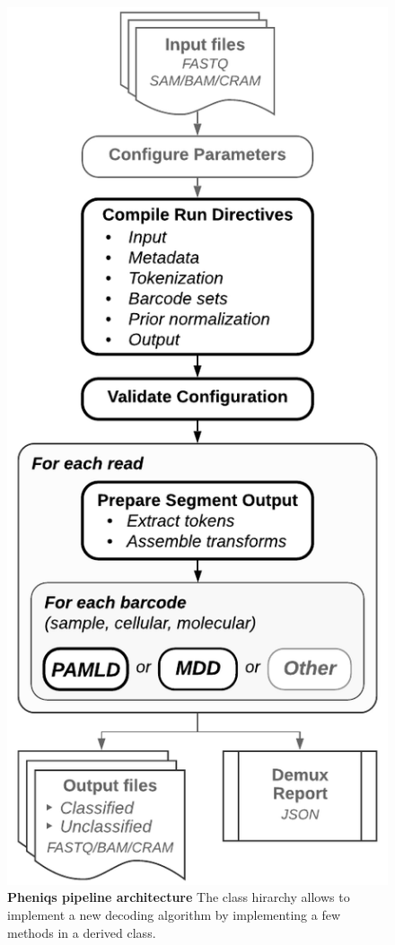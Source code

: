 \documentclass[10pt,twocolumn]{article}
\begin{document}
\begin{figure}[htbp]
\centering
\includegraphics[keepaspectratio,scale=1]{pipeline_overview}
\caption{\footnotesize{\textbf{Pheniqs pipeline architecture} The class hirarchy allows to implement a new decoding algorithm by implementing a few methods in a derived class. } }
\label{fig:17}
\end{figure}
\end{document}
